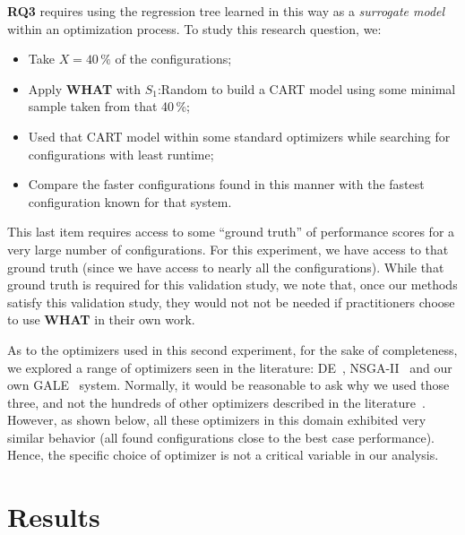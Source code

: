 \documentclass{sig-alternative}
\newcommand{\bi}{\begin{itemize}}%
\newcommand{\ei}{\end{itemize}}
\newcommand{\what}{{\bf WHAT }}
\begin{document}
{\bf RQ3} requires using the regression tree learned in this way as a {\em surrogate model} within an optimization process. To study this research question, we:
\bi
\item Take   $X=40\,\%$ of the configurations;
\item Apply \what with $S_1$:Random to build a CART model using some minimal sample taken from that 40\,\%;
\item Used that CART model within some standard optimizers while searching for 
configurations with least runtime;
\item  Compare the faster configurations found in this manner with the fastest configuration
known for that system.
\ei
This last item requires access to some ``ground truth'' of performance scores for a very
large number of configurations. For this experiment, we have access to that ground truth
(since we have access to nearly all the configurations). While that ground truth is required for this
validation study, we note that, once our methods satisfy this validation study,
they would not not be needed if practitioners choose to use \what in their own work.

As to the optimizers used in this second experiment, for the sake of completeness, we explored
a range of optimizers seen in the   literature:  DE~\cite{storn1997differential}, NSGA-II~\cite{deb00afast}
and our own GALE~\cite{krall2014gale,zuluaga2013active} system.   Normally,
it would be  reasonable to ask
why we used those three, and not the hundreds of other 
optimizers described in the literature~\cite{fletcher13,harman12}. However,
as shown below, all these optimizers in this
domain exhibited  very similar
behavior (all found configurations close to the
best case performance). Hence, the specific
choice of optimizer is not a critical
variable in  our analysis.


\newpage
\section{Results}
\end{document}
